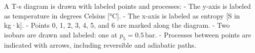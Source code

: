 A T-s diagram is drawn with labeled points and processes:  
- The y-axis is labeled as temperature in degrees Celsius [°C].  
- The x-axis is labeled as entropy [S in kg·k].  
- Points 0, 1, 2, 3, 4, 5, and 6 are marked along the diagram.  
- Two isobars are drawn and labeled: one at \( p_5 = 0.5 \, \text{bar} \).  
- Processes between points are indicated with arrows, including reversible and adiabatic paths.